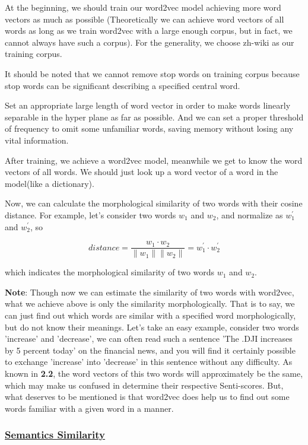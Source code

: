 \documentclass[10pt, conference, compsocconf]{IEEEtran}
\begin{document}
At the beginning, we should train our word2vec model achieving more word vectors as much as possible (Theoretically we can achieve word vectors of all words as long as we train word2vec with a large enough corpus, but in fact, we cannot always have such a corpus). For the generality, we choose zh-wiki as our training corpus.

It should be noted that we cannot remove stop words on training corpus because stop words can be significant describing a specified central word.

Set an appropriate large length of word vector in order to make words linearly separable in the hyper plane as far as possible. And we can set a proper threshold of frequency to omit some unfamiliar words, saving memory without losing any vital information.

After training, we achieve a word2vec model, meanwhile we get to know the word vectors of all words. We should just look up a word vector of a word in the model(like a dictionary).

Now, we can calculate the morphological similarity of two words with their cosine distance. For example, let's consider two words $w_{1}$ and $w_{2}$, and normalize as $w_{1}^{'}$ and $w_{2}^{'}$, so

\begin{equation}
distance = \frac{w_{1}\cdot w_{2}}{\|w_{1}\|\|w_{2}\|} = w_{1}^{'}\cdot w_{2}^{'}
\end{equation}

which indicates the morphological similarity of two words $w_{1}$ and $w_{2}$.

\textbf{Note}: Though now we can estimate the similarity of two words with word2vec, what we achieve above is only the similarity morphologically. That is to say, we can just find out which words are similar with a specified word morphologically, but do not know their meanings. Let's take an easy example, consider two words 'increase' and 'decrease', we can often read such a sentence 'The .DJI increases by 5 percent today' on the financial news, and you will find it certainly possible to exchange 'increase' into 'decrease' in this sentence without any difficulty. As known in \textbf{2.2}, the word vectors of this two words will approximately be the same, which may make us confused in determine their respective Senti-scores. But, what deserves to be mentioned is that word2vec does help us to find out some words familiar with a given word in a manner.

\subsubsection{\underline{Semantics Similarity}}
\end{document}
